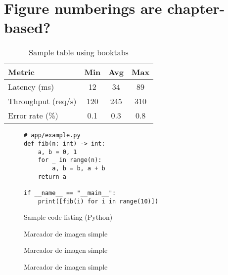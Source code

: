 \documentclass{report}
\begin{document}
\chapter{Figure numberings are chapter-based?}

\begin{table}[htbp]
  \centering
  \caption{Sample table using booktabs}\label{tab:metrics}
  \begin{tabular}{@{}lccc@{}}
    \toprule
    Metric & Min & Avg & Max \\
    \midrule
    Latency (ms) & 12 & 34 & 89 \\
    Throughput (req/s) & 120 & 245 & 310 \\
    Error rate (\%) & 0.1 & 0.3 & 0.8 \\
    \bottomrule
  \end{tabular}
\end{table}

\begin{figure}[htbp]
  \centering
  \begin{minipage}{0.9\linewidth}
\begin{verbatim}
# app/example.py
def fib(n: int) -> int:
    a, b = 0, 1
    for _ in range(n):
        a, b = b, a + b
    return a

if __name__ == "__main__":
    print([fib(i) for i in range(10)])
\end{verbatim}
  \end{minipage}
  \caption{Sample code listing (Python)}\label{fig:listing-python}
\end{figure}

\begin{figure}[htbp]
  \centering
  \setlength{\fboxsep}{0pt}\fbox{\rule{0pt}{40mm}\rule{80mm}{0pt}}
  \caption{Marcador de imagen simple}
\end{figure}
\begin{figure}[htbp]
  \centering
  \setlength{\fboxsep}{0pt}\fbox{\rule{0pt}{40mm}\rule{80mm}{0pt}}
  \caption{Marcador de imagen simple}
\end{figure}
\begin{figure}[htbp]
  \centering
  \setlength{\fboxsep}{0pt}\fbox{\rule{0pt}{40mm}\rule{80mm}{0pt}}
  \caption{Marcador de imagen simple}
\end{figure}
\end{document}
